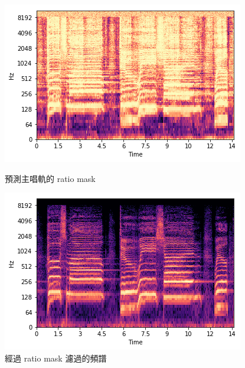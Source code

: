\begin{figure}[htbp]
    \hfil
    \begin{minipage}[t]{0.45\textwidth}
        \centering
        \includegraphics[width=\textwidth]{./figures/chapter02_method/oracle_filtering1.png}
        \caption {預測主唱軌的 ratio mask}
        \label{oracle_filtering1}
    \end{minipage}
    \begin{minipage}[t]{0.45\textwidth}
        \centering
        \includegraphics[width=\textwidth]{./figures/chapter02_method/oracle_filtering2.png}
        \caption {經過 ratio mask 濾過的頻譜}
        \label{oracle_filtering2}
    \end{minipage}
    \hfil
\end{figure}

